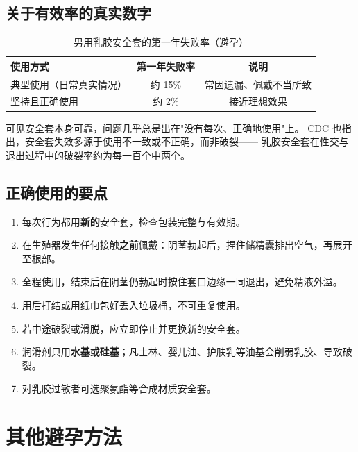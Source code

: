 \documentclass[12pt,UTF8,openany]{ctexbook}
\begin{document}
\subsection*{关于有效率的真实数字}

\begin{table}[htbp]
  \centering
  \caption{男用乳胶安全套的第一年失败率（避孕）}
  \begin{tabularx}{\textwidth}{@{}l C C@{}}
    \toprule
    \textbf{使用方式} & \textbf{第一年失败率} & \textbf{说明} \\
    \midrule
    典型使用（日常真实情况） & 约 15\% & 常因遗漏、佩戴不当所致 \\
    坚持且正确使用           & 约 2\%  & 接近理想效果 \\
    \bottomrule
  \end{tabularx}
\end{table}

可见安全套本身可靠，问题几乎总是出在"没有每次、正确地使用"上。
CDC 也指出，安全套失效多源于使用不一致或不正确，而非破裂——
乳胶安全套在性交与退出过程中的破裂率约为每一百个中两个。

\subsection*{正确使用的要点}

\begin{enumerate}[leftmargin=2em,itemsep=0.3em]
  \item 每次行为都用\textbf{新的}安全套，检查包装完整与有效期。
  \item 在生殖器发生任何接触\textbf{之前}佩戴：阴茎勃起后，捏住储精囊排出空气，再展开至根部。
  \item 全程使用，结束后在阴茎仍勃起时按住套口边缘一同退出，避免精液外溢。
  \item 用后打结或用纸巾包好丢入垃圾桶，不可重复使用。
  \item 若中途破裂或滑脱，应立即停止并更换新的安全套。
  \item 润滑剂只用\textbf{水基或硅基}；凡士林、婴儿油、护肤乳等油基会削弱乳胶、导致破裂。
  \item 对乳胶过敏者可选聚氨酯等合成材质安全套。
\end{enumerate}

\section{其他避孕方法}
\end{document}
